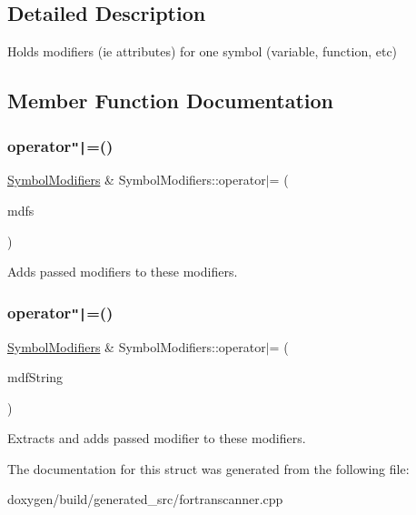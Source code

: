 \subsection{Detailed Description}
Holds modifiers (ie attributes) for one symbol (variable, function, etc) 

\subsection{Member Function Documentation}
\mbox{\label{struct_symbol_modifiers_a73f1b078fd79fffd3a50ca217b580bed}} 
\subsubsection{\texorpdfstring{operator\texttt{"|}=()}{operator|=()}\hspace{0.1cm}{\footnotesize\ttfamily [1/2]}}
{\footnotesize\ttfamily \mbox{\hyperlink{struct_symbol_modifiers}{Symbol\+Modifiers}} \& Symbol\+Modifiers\+::operator$\vert$= (\begin{DoxyParamCaption}\item[{const \mbox{\hyperlink{struct_symbol_modifiers}{Symbol\+Modifiers}} \&}]{mdfs }\end{DoxyParamCaption})}

Adds passed modifiers to these modifiers. \mbox{\label{struct_symbol_modifiers_aaca9d411d0392efd25510ca3209178d0}} 
\subsubsection{\texorpdfstring{operator\texttt{"|}=()}{operator|=()}\hspace{0.1cm}{\footnotesize\ttfamily [2/2]}}
{\footnotesize\ttfamily \mbox{\hyperlink{struct_symbol_modifiers}{Symbol\+Modifiers}} \& Symbol\+Modifiers\+::operator$\vert$= (\begin{DoxyParamCaption}\item[{\mbox{\hyperlink{class_q_c_string}{Q\+C\+String}}}]{mdf\+String }\end{DoxyParamCaption})}

Extracts and adds passed modifier to these modifiers. 

The documentation for this struct was generated from the following file\+:\begin{DoxyCompactItemize}
\item 
doxygen/build/generated\+\_\+src/fortranscanner.\+cpp\end{DoxyCompactItemize}
